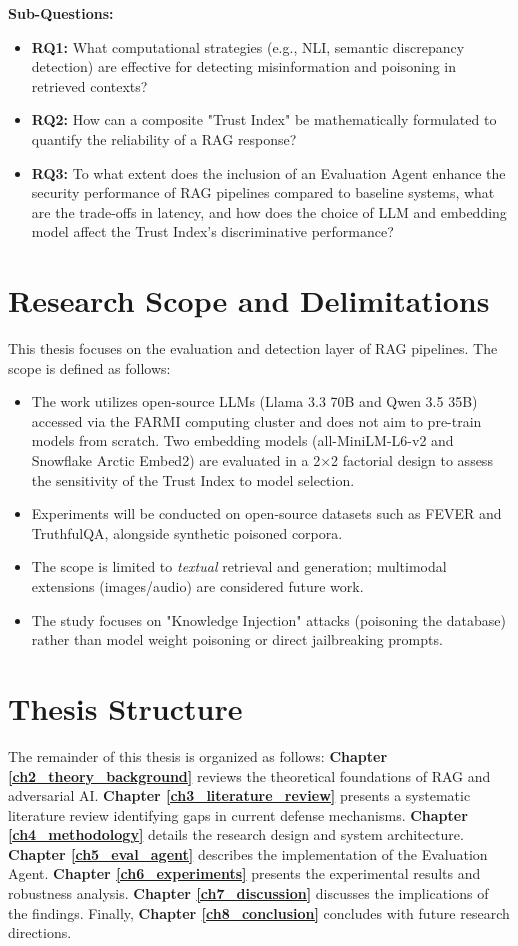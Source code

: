 \textbf{Sub-Questions:}
\begin{itemize}
    \item \textbf{RQ1:} What computational strategies (e.g., NLI, semantic discrepancy detection) are effective for detecting misinformation and poisoning in retrieved contexts?
    \item \textbf{RQ2:} How can a composite "Trust Index" be mathematically formulated to quantify the reliability of a RAG response?
    \item \textbf{RQ3:} To what extent does the inclusion of an Evaluation Agent enhance the security performance of RAG pipelines compared to baseline systems, what are the trade-offs in latency, and how does the choice of LLM and embedding model affect the Trust Index's discriminative performance?
\end{itemize}

\section{Research Scope and Delimitations}
\label{sec:scope}

This thesis focuses on the evaluation and detection layer of RAG pipelines. The scope is defined as follows:
\begin{itemize}
    \item The work utilizes open-source LLMs (Llama 3.3 70B and Qwen 3.5 35B) accessed via the FARMI computing cluster and does not aim to pre-train models from scratch. Two embedding models (all-MiniLM-L6-v2 and Snowflake Arctic Embed2) are evaluated in a 2×2 factorial design to assess the sensitivity of the Trust Index to model selection.
    \item Experiments will be conducted on open-source datasets such as FEVER and TruthfulQA, alongside synthetic poisoned corpora.
    \item The scope is limited to \textit{textual} retrieval and generation; multimodal extensions (images/audio) are considered future work.
    \item The study focuses on "Knowledge Injection" attacks (poisoning the database) rather than model weight poisoning or direct jailbreaking prompts.
\end{itemize}

\section{Thesis Structure}
\label{sec:structure}

The remainder of this thesis is organized as follows:
\textbf{Chapter \ref{ch2_theory_background}} reviews the theoretical foundations of RAG and adversarial AI. 
\textbf{Chapter \ref{ch3_literature_review}} presents a systematic literature review identifying gaps in current defense mechanisms. 
\textbf{Chapter \ref{ch4_methodology}} details the research design and system architecture. 
\textbf{Chapter \ref{ch5_eval_agent}} describes the implementation of the Evaluation Agent. 
\textbf{Chapter \ref{ch6_experiments}} presents the experimental results and robustness analysis. 
\textbf{Chapter \ref{ch7_discussion}} discusses the implications of the findings. 
Finally, \textbf{Chapter \ref{ch8_conclusion}} concludes with future research directions.
